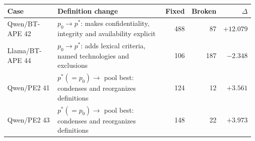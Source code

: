 \begin{tabular}{p{.19\linewidth}p{.40\linewidth}rrr}
\toprule
Case & Definition change & Fixed & Broken & $\Delta$ \\
\midrule
Qwen/BT-APE 42 & $p_0\!\rightarrow p^*$: makes confidentiality, integrity and availability explicit & 488 & 87 & $+12.079$ \\
\addlinespace
Llama/BT-APE 44 & $p_0\!\rightarrow p^*$: adds lexical criteria, named technologies and exclusions & 106 & 187 & $-2.348$ \\
\addlinespace
Qwen/PE2 41 & $p^*(=p_0)\!\rightarrow$ pool best: condenses and reorganizes definitions & 124 & 12 & $+3.561$ \\
\addlinespace
Qwen/PE2 43 & $p^*(=p_0)\!\rightarrow$ pool best: condenses and reorganizes definitions & 148 & 22 & $+3.973$ \\
\bottomrule
\end{tabular}
